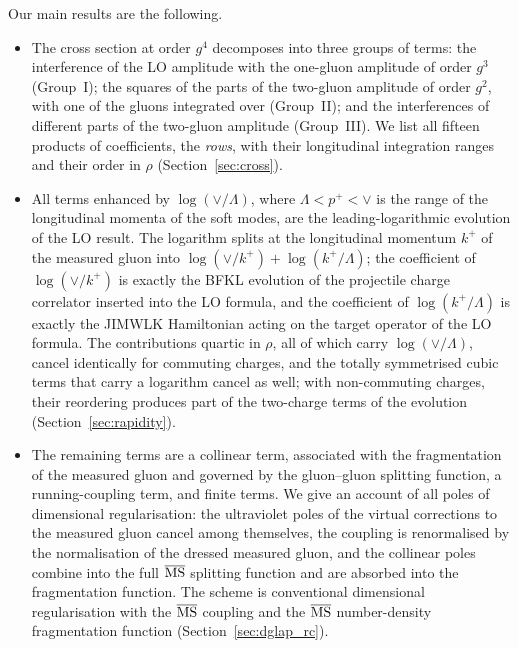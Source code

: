 Our main results are the following.
\begin{itemize}
\item The cross section at order $g^4$ decomposes into three groups of terms: the interference of the LO amplitude with the one-gluon amplitude of order $g^3$ (Group~I); the squares of the parts of the two-gluon amplitude of order $g^2$, with one of the gluons integrated over (Group~II); and the interferences of different parts of the two-gluon amplitude (Group~III). We list all fifteen products of coefficients, the \emph{rows}, with their longitudinal integration ranges and their order in $\rho$ (Section~\ref{sec:cross}).
\item All terms enhanced by $\log(\vee/\Lambda)$, where $\Lambda<p^+<\vee$ is the range of the longitudinal momenta of the soft modes, are the leading-logarithmic evolution of the LO result. The logarithm splits at the longitudinal momentum $k^+$ of the measured gluon into $\log(\vee/k^+)+\log(k^+/\Lambda)$; the coefficient of $\log(\vee/k^+)$ is exactly the BFKL evolution of the projectile charge correlator inserted into the LO formula, and the coefficient of $\log(k^+/\Lambda)$ is exactly the JIMWLK Hamiltonian acting on the target operator of the LO formula. The contributions quartic in $\rho$, all of which carry $\log(\vee/\Lambda)$, cancel identically for commuting charges, and the totally symmetrised cubic terms that carry a logarithm cancel as well; with non-commuting charges, their reordering produces part of the two-charge terms of the evolution (Section~\ref{sec:rapidity}).
\item The remaining terms are a collinear term, associated with the fragmentation of the measured gluon and governed by the gluon--gluon splitting function, a running-coupling term, and finite terms. We give an account of all poles of dimensional regularisation: the ultraviolet poles of the virtual corrections to the measured gluon cancel among themselves, the coupling is renormalised by the normalisation of the dressed measured gluon, and the collinear poles combine into the full $\overline{\rm MS}$ splitting function and are absorbed into the fragmentation function. The scheme is conventional dimensional regularisation with the $\overline{\rm MS}$ coupling and the $\overline{\rm MS}$ number-density fragmentation function (Section~\ref{sec:dglap_rc}).

\end{itemize}
